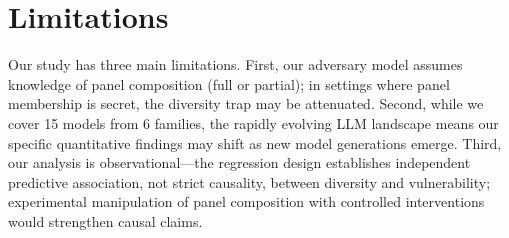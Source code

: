 \documentclass[11pt,a4paper]{article}
\begin{document}
\section*{Limitations}

Our study has three main limitations. First, our adversary model assumes knowledge of panel composition (full or partial); in settings where panel membership is secret, the diversity trap may be attenuated. Second, while we cover 15 models from 6 families, the rapidly evolving LLM landscape means our specific quantitative findings may shift as new model generations emerge. Third, our analysis is observational---the regression design establishes independent predictive association, not strict causality, between diversity and vulnerability; experimental manipulation of panel composition with controlled interventions would strengthen causal claims.



\end{document}
